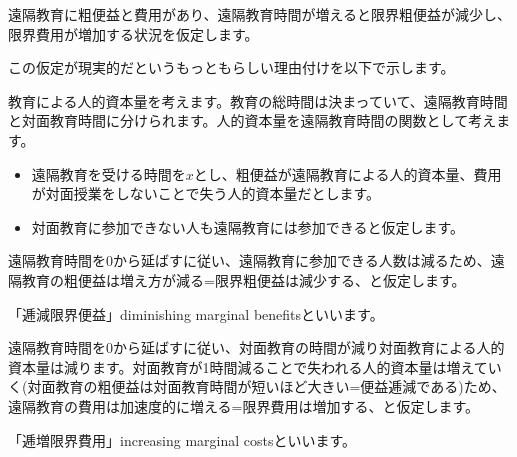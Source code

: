 \begin{frame}[t]{}
遠隔教育に粗便益と費用があり、遠隔教育時間が増えると限界粗便益が減少し、限界費用が増加する状況を仮定します。
\begin{dinglist}{43}\footnotesize
\vspace{1.0ex}\setlength{\itemsep}{1.0ex}\setlength{\baselineskip}{12pt}
\pause
\item	この仮定が現実的だというもっともらしい理由付けを以下で示します。\\[2ex]
\end{dinglist}

\pause
教育による人的資本量を考えます。教育の総時間は決まっていて、遠隔教育時間と対面教育時間に分けられます。人的資本量を遠隔教育時間の関数として考えます。
\begin{itemize}
\vspace{1.0ex}\setlength{\itemsep}{1.0ex}\setlength{\baselineskip}{12pt}
\pause
\item	遠隔教育を受ける時間を$x$とし、粗便益が遠隔教育による人的資本量、費用が対面授業をしないことで失う人的資本量だとします。
\pause
\item	対面教育に参加できない人も遠隔教育には参加できると仮定します。
\end{itemize}
\begin{dinglist}{43}
\vspace{1.0ex}\setlength{\itemsep}{1.0ex}\setlength{\baselineskip}{12pt}
\pause
\item	遠隔教育時間を0から延ばすに従い、遠隔教育に参加できる人数は減るため、遠隔教育の粗便益は増え方が減る=限界粗便益は減少する、と仮定します。
	\begin{dinglist}{45}\footnotesize
	\vspace{1.0ex}\setlength{\itemsep}{1.0ex}\setlength{\baselineskip}{12pt}
\pause
	\item	「逓減限界便益」diminishing marginal benefitsといいます。
	\end{dinglist}
\pause
\item	遠隔教育時間を0から延ばすに従い、対面教育の時間が減り対面教育による人的資本量は減ります。対面教育が1時間減ることで失われる人的資本量は増えていく(対面教育の粗便益は対面教育時間が短いほど大きい=便益逓減である)ため、遠隔教育の費用は加速度的に増える=限界費用は増加する、と仮定します。
	\begin{dinglist}{45}\footnotesize
	\vspace{1.0ex}\setlength{\itemsep}{1.0ex}\setlength{\baselineskip}{12pt}
\pause
	\item	「逓増限界費用」increasing marginal costsといいます。
	\end{dinglist}
\end{dinglist}
\end{frame}


